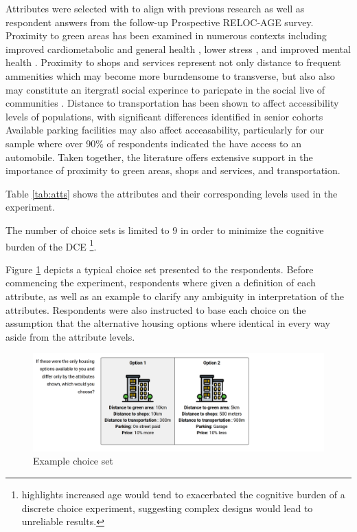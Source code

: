 \documentclass[3p,11pt ]{elsarticle}
\begin{document}
Attributes were selected with to align with previous research as well as respondent answers from the follow-up Prospective RELOC-AGE survey.
Proximity to green areas has been examined in numerous contexts including improved cardiometabolic and general health \citep{paquetAreAccessibilityCharacteristics2013,  maasGreenSpaceUrbanity2006,},
lower stress \citep{nielsenGreenAreasAffect2007},
and improved mental health \citep{cohen-clineAccessGreenSpace2015,sturmProximityUrbanParks2014}.
Proximity to shops and services represent not only distance to frequent ammenities which may become more burndensome to transverse,
but also also may constitute an itergratl social experince to paricpate in the social live of communities
\citep{lucasMethodEvaluateEquitable2016}.
Distance to transportation has been shown to affect  accessibility levels of populations,
with significant differences identified in senior cohorts \citep{ricciardiExploringPublicTransport2015,hildebrandDimensionsElderlyTravel2003,alsnihMobilityAccessibilityExpectations2003}
Available parking facilities may also affect acceasability,
particularly for our sample where over 90\% of respondents indicated the have access to an automobile.
Taken together,
the literature offers extensive support in the importance of proximity to green areas, shops and services, and transportation.

Table \ref{tab:atts}  shows the attributes and their corresponding levels used in the experiment.





The number of choice sets is limited to 9 in order to minimize the cognitive burden of the DCE \citep{manghamHowNotDesigning2009,deshazoDesigningChoiceSets2002}
\footnote{\cite{himmlerWhatWorksBetter2021} highlights increased age would tend to exacerbated the cognitive burden of a discrete choice experiment, suggesting complex designs would lead to unreliable results.}.


Figure \ref{fig:choice_set} depicts a typical choice set presented to the respondents.
Before commencing the experiment,
respondents where given a definition of each attribute, as well as an example to clarify any ambiguity in interpretation of the attributes.
Respondents were also instructed to base each choice on the assumption that the alternative housing options where identical in every way aside from the attribute levels.


\begin{figure}[H]
\centering
\includegraphics[scale=0.25]{figures/choice_set.png}
\caption{Example choice set \label{fig:choice_set}}
\end{figure}
\end{document}
